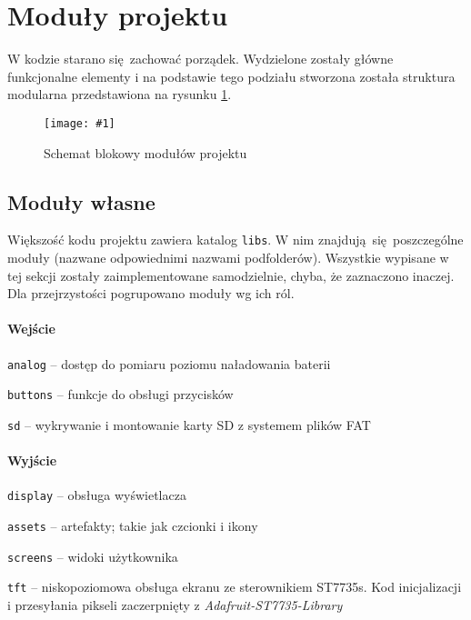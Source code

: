 \documentclass[12pt]{report}
\let\tempone\itemize
\let\temptwo\enditemize
\renewenvironment{itemize}{\tempone\setlength{\itemsep}{0cm}}{\temptwo}
\newcommand{\imgint}[4]{
	\begin{figure}[{#4}]
		\centering
		\texttt{[image: \#1]}
		\caption{#2}
		\label{#1}
	\end{figure}
}
\newcommand{\imgh}[3]{\imgint{#1}{#2}{#3}{H}}
\begin{document}
	\section{Moduły projektu}
		W kodzie starano się zachować porządek. Wydzielone zostały główne funkcjonalne elementy i na podstawie tego podziału stworzona została struktura modularna przedstawiona na rysunku \ref{3/pico-radio-code-block-diagram}.
		\imgh{3/pico-radio-code-block-diagram}{Schemat blokowy modułów projektu}{0.7}
		
		\subsection{Moduły własne}
			Większość kodu projektu zawiera katalog \lstinline|libs|. W nim znajdują się poszczególne moduły (nazwane odpowiednimi nazwami podfolderów). Wszystkie wypisane w tej sekcji zostały zaimplementowane samodzielnie, chyba, że zaznaczono inaczej. Dla przejrzystości pogrupowano moduły wg ich ról.
		
			\paragraph{Wejście}
				\begin{itemize}
					\item \lstinline|analog| -- dostęp do pomiaru poziomu naładowania baterii
					\item \lstinline|buttons| -- funkcje do obsługi przycisków
					\item \lstinline|sd| -- wykrywanie i montowanie karty SD z systemem plików FAT
				\end{itemize}
		
			\paragraph{Wyjście}
				\begin{itemize}
					\item \lstinline|display| -- obsługa wyświetlacza
					\begin{itemize}
						\item \lstinline|assets| -- artefakty; takie jak czcionki i ikony
						\item \lstinline|screens| -- widoki użytkownika
						\item \lstinline|tft| -- niskopoziomowa obsługa ekranu ze sterownikiem ST7735s. Kod inicjalizacji i przesyłania pikseli zaczerpnięty z \textit{Adafruit-ST7735-Library}\textsuperscript{\cite{adafruit_st7735}}
					\end{itemize}
				\end{itemize}
			
\end{document}
